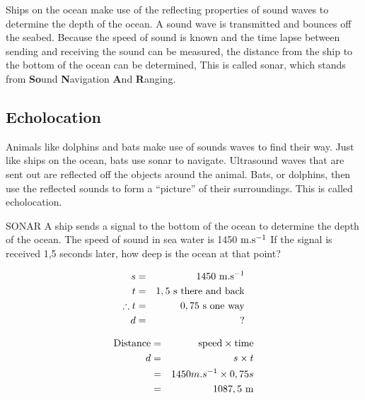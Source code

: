Ships on the ocean make use of the reflecting properties of sound waves to determine the depth of the ocean. A sound wave is transmitted and bounces off the seabed. Because the speed of sound is known and the time lapse between sending and receiving the sound can be measured, the distance from the ship to the bottom of the ocean can be determined, This is called sonar, which stands from \textbf{So}und \textbf{N}avigation \textbf{A}nd \textbf{R}anging.

\subsection{Echolocation}
Animals like dolphins and bats make use of sounds waves to find their way. Just like ships on the ocean, bats use sonar to navigate. Ultrasound waves that are sent out are reflected off the objects around the animal. Bats, or dolphins, then use the reflected sounds to form a ``picture'' of their surroundings. This is called echolocation.

\begin{wex}{SONAR}
{A ship sends a signal to the bottom of the ocean to determine the depth of the ocean. The speed of sound in sea water is 1450 $\rm{m.s^{-1}}$ If the signal is received 1,5 seconds later, how deep is the ocean at that point?}
{
\begin{eqnarray*}
s &=& 1450 \ \rm{m.s^{-1}}\\
t &=& 1,5 \ \rm{s} \ \rm{there \ and \ back}\\
\therefore t &= & 0,75 \ \rm{s} \ \rm{one \ way}\\
d &=& ?
\end{eqnarray*}

\begin{eqnarray*}
\rm{Distance} &=& \rm{speed} \times \rm{time} \\
d &=& s \times t \\
&=& 1450 m.s^{-1} \times 0,75 s \\
&=& 1087,5 \ \rm{m}
\end{eqnarray*}

}
\end{wex}

